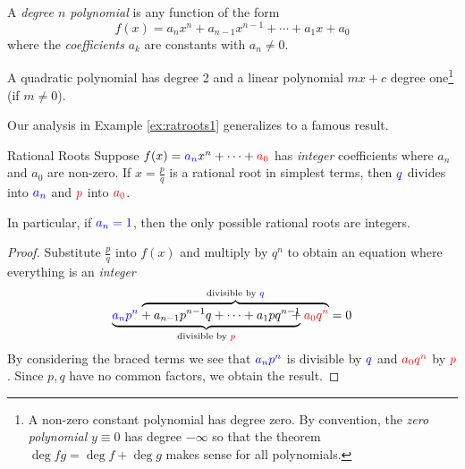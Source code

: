 
\goodbreak

\begin{defn}{}{}
	A \emph{degree $n$ polynomial} is any function of the form
	\[
		f(x)=a_nx^n+a_{n-1}x^{n-1}+\cdots+a_1x+a_0
	\]
	where the \emph{coefficients} $a_k$ are constants with $a_n\neq 0$.
\end{defn}

A quadratic polynomial has degree 2 and a linear polynomial $mx+c$ degree one\footnote{%
	A non-zero constant polynomial has degree zero. By convention, the \emph{zero polynomial} $y\equiv 0$ has degree $-\infty$ so that the theorem $\operatorname{deg} fg=\operatorname{deg} f+\operatorname{deg} g$ makes sense for all polynomials.%
} (if $m\neq 0$).\smallbreak

Our analysis in Example \ref{ex:ratroots1} generalizes to a famous result.

\begin{thm}{Rational Roots}{}
	Suppose $f(x)=\textcolor{blue}{a_n}x^n+\cdots+\textcolor{red}{a_0}$ has \emph{integer} coefficients where $a_n$ and $a_0$ are non-zero. If $x=\frac pq$ is a rational root in simplest terms, then $\textcolor{blue}{q}$ divides into $\textcolor{blue}{a_n}$ and $\textcolor{red}{p}$ into $\textcolor{red}{a_0}$.\par
	In particular, if $\textcolor{blue}{a_n=1}$, then the only possible rational roots are integers.
\end{thm}

\begin{proof}
	Substitute $\frac pq$ into $f(x)$ and multiply by $q^n$ to obtain an equation where everything is an \emph{integer}\vspace{-11pt}
	\[
		\underbrace{\textcolor{blue}{a_np^n}+a_{n-1}p^{n-1}q+\cdots+a_1pq^{n-1}}_{\text{divisible by $\textcolor{red}{p}$}} \hspace{-129pt} \overbrace{\phantom{a_{n-1}p^{n-1}q+\cdots+a_1pq^{n-1}}+\textcolor{red}{a_0q^n}}^{\text{divisible by $\textcolor{blue}{q}$}}=0
	\]
	By considering the braced terms we see that $\textcolor{blue}{a_np^n}$ is divisible by $\textcolor{blue}{q}$ and $\textcolor{red}{a_0q^n}$ by $\textcolor{red}{p}$. Since $p,q$ have no common factors, we obtain the result.
\end{proof}



